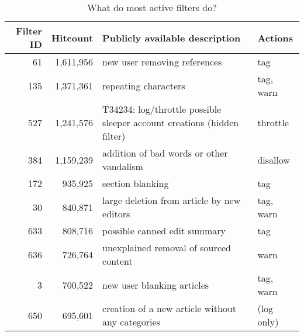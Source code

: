 \begin{table*}
  \centering
    \begin{tabular}{r r p{8cm} p{2cm} }
        Filter ID & Hitcount & Publicly available description & Actions \\
    \hline
       61 & 1,611,956 & new user removing references & tag \\
      135 & 1,371,361 & repeating characters & tag, warn \\
      527 & 1,241,576 & T34234: log/throttle possible sleeper account creations (hidden filter) & throttle \\
      384 & 1,159,239 & addition of bad words or other vandalism & disallow \\
      172 & 935,925 & section blanking & tag \\
       30 & 840,871 & large deletion from article by new editors & tag, warn \\
      633 & 808,716 & possible canned edit summary & tag \\
      636 & 726,764 & unexplained removal of sourced content & warn \\
        3 & 700,522 & new user blanking articles & tag, warn \\
      650 & 695,601 & creation of a new article without any categories & (log only) \\
  \end{tabular}
  \caption{What do most active filters do?}~\label{tab:most-active-actions}
\end{table*}


\begin{comment}
    \item how many currently trigger which action (disallow, warn, throttle, tag, ..)?
    \item how often were filters with different actions triggered? (afl\_actions) (over time) --> abuse\_filter\_log
    \item explore timestamp (I think it means "last modified"): have a lot of filters been modified recently?
    \item categorise filters according to which name spaces they apply to; pay special attention to edits in user/talks name spaces (may be indication of filtering harassment)
\end{comment}



